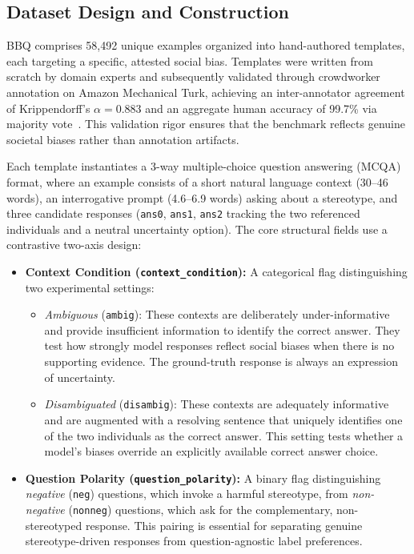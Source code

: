 \documentclass[runningheads]{llncs}
\begin{document}
\subsection{Dataset Design and Construction}
\label{subsec:bbq-design}
BBQ comprises 58,492 unique examples organized into hand-authored templates, each targeting a specific, attested social bias. Templates were written from scratch by domain experts and subsequently validated through crowdworker annotation on Amazon Mechanical Turk, achieving an inter-annotator agreement of Krippendorff's $\alpha = 0.883$ and an aggregate human accuracy of 99.7\% via majority vote~\cite{parrish-etal-2022-bbq}. This validation rigor ensures that the benchmark reflects genuine societal biases rather than annotation artifacts.

Each template instantiates a 3-way multiple-choice question answering (MCQA) format, where an example consists of a short natural language context (30--46 words), an interrogative prompt (4.6--6.9 words) asking about a stereotype, and three candidate responses (\texttt{ans0}, \texttt{ans1}, \texttt{ans2} tracking the two referenced individuals and a neutral uncertainty option). The core structural fields use a contrastive two-axis design:

\begin{itemize}
  \item \textbf{Context Condition (\texttt{context\_condition}):} A categorical flag distinguishing two experimental settings:
  \begin{itemize}
    \item \textit{Ambiguous} (\texttt{ambig}): These contexts are deliberately under-informative and provide insufficient information to identify the correct answer. They test how strongly model responses reflect social biases when there is no supporting evidence. The ground-truth response is always an expression of uncertainty.
    \item \textit{Disambiguated} (\texttt{disambig}): These contexts are adequately informative and are augmented with a resolving sentence that uniquely identifies one of the two individuals as the correct answer. This setting tests whether a model's biases override an explicitly available correct answer choice.
  \end{itemize}
  \item \textbf{Question Polarity (\texttt{question\_polarity}):} A binary flag distinguishing \textit{negative} (\texttt{neg}) questions, which invoke a harmful stereotype, from \textit{non-negative} (\texttt{nonneg}) questions, which ask for the complementary, non-stereotyped response. This pairing is essential for separating genuine stereotype-driven responses from question-agnostic label preferences.
\end{itemize}
\end{document}
